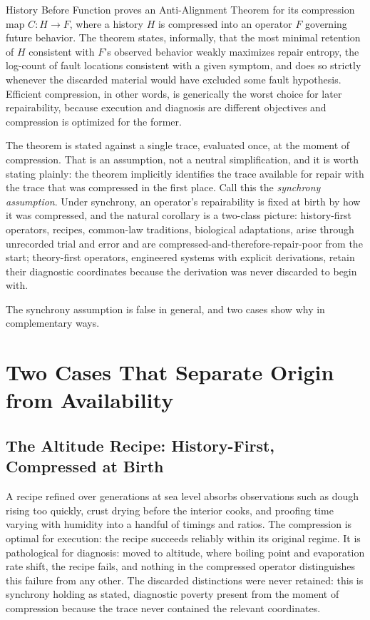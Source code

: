 \documentclass[11pt]{article}
\begin{document}
History Before Function proves an Anti-Alignment Theorem for its compression map $C: H \to F$, where a history $H$ is compressed into an operator $F$ governing future behavior. The theorem states, informally, that the most minimal retention of $H$ consistent with $F$'s observed behavior weakly maximizes repair entropy, the log-count of fault locations consistent with a given symptom, and does so strictly whenever the discarded material would have excluded some fault hypothesis. Efficient compression, in other words, is generically the worst choice for later repairability, because execution and diagnosis are different objectives and compression is optimized for the former.

The theorem is stated against a single trace, evaluated once, at the moment of compression. That is an assumption, not a neutral simplification, and it is worth stating plainly: the theorem implicitly identifies the trace available for repair with the trace that was compressed in the first place. Call this the \emph{synchrony assumption}. Under synchrony, an operator's repairability is fixed at birth by how it was compressed, and the natural corollary is a two-class picture: history-first operators, recipes, common-law traditions, biological adaptations, arise through unrecorded trial and error and are compressed-and-therefore-repair-poor from the start; theory-first operators, engineered systems with explicit derivations, retain their diagnostic coordinates because the derivation was never discarded to begin with.

The synchrony assumption is false in general, and two cases show why in complementary ways.

\section{Two Cases That Separate Origin from Availability}

\subsection{The Altitude Recipe: History-First, Compressed at Birth}

A recipe refined over generations at sea level absorbs observations such as dough rising too quickly, crust drying before the interior cooks, and proofing time varying with humidity into a handful of timings and ratios. The compression is optimal for execution: the recipe succeeds reliably within its original regime. It is pathological for diagnosis: moved to altitude, where boiling point and evaporation rate shift, the recipe fails, and nothing in the compressed operator distinguishes this failure from any other. The discarded distinctions were never retained: this is synchrony holding as stated, diagnostic poverty present from the moment of compression because the trace never contained the relevant coordinates.
\end{document}
